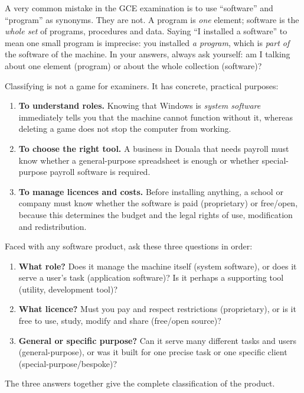 \documentclass[11pt]{article}
\newcommand{\cle}[1]{{\popxbold\color{popdark}#1}}
\newcounter{popsec}
\newcounter{popsub}
\newcommand{\courssub}[1]{%
  \stepcounter{popsub}%
  \par\vspace{9pt}\noindent{\popxbold\fontsize{11.5}{13}\selectfont\color{popink}{\color{poporange}\thepopsec.\thepopsub}\hspace{6pt}#1}\par\nopagebreak\vspace{4pt}
}
\begin{document}
\begin{attention}
A very common mistake in the GCE examination is to use ``software'' and ``program'' as synonyms. They are not. A \cle{program} is \emph{one} element; \cle{software} is the \emph{whole set} of programs, procedures and data. Saying ``I installed a software'' to mean one small program is imprecise: you installed \emph{a program}, which is \emph{part of} the software of the machine. In your answers, always ask yourself: am I talking about one element (program) or about the whole collection (software)?
\end{attention}

\courssub{Why do we classify software?}

Classifying is not a game for examiners. It has concrete, practical purposes:

\begin{enumerate}
\item \textbf{To understand roles.} Knowing that Windows is \emph{system software} immediately tells you that the machine cannot function without it, whereas deleting a game does not stop the computer from working.
\item \textbf{To choose the right tool.} A business in Douala that needs payroll must know whether a general-purpose spreadsheet is enough or whether special-purpose payroll software is required.
\item \textbf{To manage licences and costs.} Before installing anything, a school or company must know whether the software is paid (proprietary) or free/open, because this determines the budget and the legal rights of use, modification and redistribution.
\end{enumerate}

\begin{methode}
Faced with any software product, ask these three questions in order:
\begin{enumerate}
\item \textbf{What role?} Does it manage the machine itself (system software), or does it serve a user's task (application software)? Is it perhaps a supporting tool (utility, development tool)?
\item \textbf{What licence?} Must you pay and respect restrictions (proprietary), or is it free to use, study, modify and share (free/open source)?
\item \textbf{General or specific purpose?} Can it serve many different tasks and users (general-purpose), or was it built for one precise task or one specific client (special-purpose/bespoke)?
\end{enumerate}
The three answers together give the complete classification of the product.
\end{methode}
\end{document}

